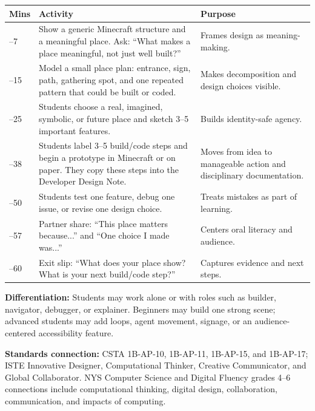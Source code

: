 \renewcommand{\arraystretch}{0.7}
\setlength{\tabcolsep}{2pt}
\begin{tabularx}{\textwidth}{|>{\raggedright\arraybackslash}p{}|Y|>{\raggedright\arraybackslash}p{0.3\textwidth}|}
\hline
{}
\textbf{Mins} & \textbf{Activity} & \textbf{Purpose} \\ --7 & Show a generic Minecraft structure and a meaningful place. Ask: ``What makes a place meaningful, not just well built?'' & Frames design as meaning-making. \\ --15 & Model a small place plan: entrance, sign, path, gathering spot, and one repeated pattern that could be built or coded. & Makes decomposition and design choices visible. \\ --25 & Students choose a real, imagined, symbolic, or future place and sketch 3--5 important features. & Builds identity-safe agency. \\ --38 & Students label 3--5 build/code steps and begin a prototype in Minecraft or on paper. \textcolor{LessonTwoAccent}{They copy these steps into the Developer Design Note.} & Moves from idea to manageable action and disciplinary documentation. \\ --50 & Students test one feature, debug one issue, or revise one design choice. & Treats mistakes as part of learning. \\ --57 & Partner share: ``This place matters because...'' and ``One choice I made was...'' & Centers oral literacy and audience. \\ --60 & Exit slip: ``What does your place show? What is your next build/code step?'' & Captures evidence and next steps. \\ \hline
\end{tabularx}

\textbf{Differentiation:} {Students may work alone or with roles such as builder, navigator, debugger, or explainer. Beginners may build one strong scene; advanced students may add loops, agent movement, signage, or an audience-centered accessibility feature.}

\textbf{Standards connection:} CSTA 1B-AP-10, 1B-AP-11, 1B-AP-15, and 1B-AP-17; ISTE Innovative Designer, Computational Thinker, Creative Communicator, and Global Collaborator. \textcolor{LessonTwoAccent}{NYS Computer Science and Digital Fluency grades 4--6 connections include computational thinking, digital design, collaboration, communication, and impacts of computing.}

